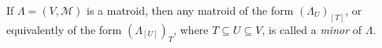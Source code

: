 If $\Lambda = (V, \mathcal{M})$ is a matroid, then any matroid of the form $(\Lambda_U)_{[T]}$, or equivalently of the form $(\Lambda_{[U]})_T$, where $T \subseteq U \subseteq V$, is called a \textit{minor} of $\Lambda$.
